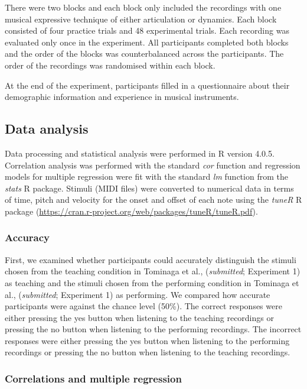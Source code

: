 \documentclass[
  man,floatsintext]{apa6}
\begin{document}
There were two blocks and each block only included the recordings with one musical expressive technique of either articulation or dynamics. Each block consisted of four practice trials and 48 experimental trials. Each recording was evaluated only once in the experiment. All participants completed both blocks and the order of the blocks was counterbalanced across the participants. The order of the recordings was randomised within each block.

At the end of the experiment, participants filled in a questionnaire about their demographic information and experience in musical instruments.

\hypertarget{data-analysis}{%
\subsection{Data analysis}\label{data-analysis}}

Data processing and statistical analysis were performed in R version 4.0.5. Correlation analysis was performed with the standard \emph{cor} function and regression models for multiple regression were fit with the standard \emph{lm} function from the \emph{stats} R package. Stimuli (MIDI files) were converted to numerical data in terms of time, pitch and velocity for the onset and offset of each note using the \emph{tuneR} R package (\url{https://cran.r-project.org/web/packages/tuneR/tuneR.pdf}).

\hypertarget{accuracy}{%
\subsubsection{Accuracy}\label{accuracy}}

First, we examined whether participants could accurately distinguish the stimuli chosen from the teaching condition in Tominaga et al., (\emph{submitted}; Experiment 1) as teaching and the stimuli chosen from the performing condition in Tominaga et al., (\emph{submitted}; Experiment 1) as performing. We compared how accurate participants were against the chance level (50\%). The correct responses were either pressing the yes button when listening to the teaching recordings or pressing the no button when listening to the performing recordings. The incorrect responses were either pressing the yes button when listening to the performing recordings or pressing the no button when listening to the teaching recordings.

\hypertarget{correlations-and-multiple-regression}{%
\subsubsection{Correlations and multiple regression}\label{correlations-and-multiple-regression}}
\end{document}
